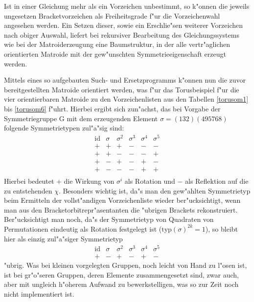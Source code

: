 Ist in einer Gleichung mehr als ein Vorzeichen unbestimmt, so k"onnen die
jeweils ungesetzen Bracketvorzeichen als Freiheitsgrade f"ur die Vorzeichenwahl
angesehen werden. Ein Setzen dieser, sowie ein Erschlie"sen weiterer Vorzeichen
nach obiger Auswahl, liefert bei rekursiver Bearbeitung des Gleichungssystems
wie bei der Matroiderzeugung eine Baumstruktur, in der alle vertr"aglichen
orientierten Matroide mit der gew"unschten Symmetrieeigenschaft erzeugt werden.

Mittels eines so aufgebauten Such- und Ersetzprogramms k"onnen nun die
zuvor bereitgestellten Matroide orientiert werden, was f"ur das Torusbeispiel
f"ur die vier orientierbaren Matroide zu den Vorzeichenlisten aus den Tabellen
\ref{torusom1} bis \ref{torusom6} f"uhrt. Hierbei ergibt sich zun"achst, das
bei Vorgabe der Symmetriegruppe G mit dem erzeugenden Element
$\sigma = (132)(495768)$ folgende Symmetrietypen zul"a"sig sind:
$$\begin{array}{c|c|c|c|c|c}
\mbox{id} & \sigma & \sigma^2 & \sigma^3 & \sigma^4 & \sigma^5 \\
\hline
+ & + & + & - & - & - \\
+ & + & - & - & - & + \\
+ & - & + & - & + & - \\
+ & - & - & - & + & + \\
\end{array}$$
Hierbei bedeutet $+$ die Wirkung von $\sigma^i$ als Rotation und $-$ als
Reflektion auf die zu entstehenden $\chi$. Besonders wichtig ist, da"s man
den gew"ahlten Symmetrietyp beim Ermitteln der vollst"andigen Vorzeichenliste
wieder ber"ucksichtigt, wenn man aus den Bracketorbitrepr"asentanten die
"ubrigen Brackets rekonstruiert. Ber"ucksichtigt man noch, da"s der Symmetrietyp
von Quadraten von Permutationen eindeutig als Rotation festgelegt ist
($\mbox{typ}(\sigma)^{2k}=1$), so bleibt hier als einzig zul"a"siger
Symmetrietyp
$$\begin{array}{c|c|c|c|c|c}
\mbox{id} & \sigma & \sigma^2 & \sigma^3 & \sigma^4 & \sigma^5 \\
\hline
+ & - & + & - & + & -
\end{array}$$
"ubrig. Was bei kleinen vorgelegten Gruppen, noch leicht von Hand zu l"osen
ist, ist bei gr"o"seren Gruppen, deren Elemente zusammengesetzt sind, zwar
auch, aber mit ungleich h"oherem Aufwand zu bewerkstelligen, was so zur Zeit
noch nicht implementiert ist.

